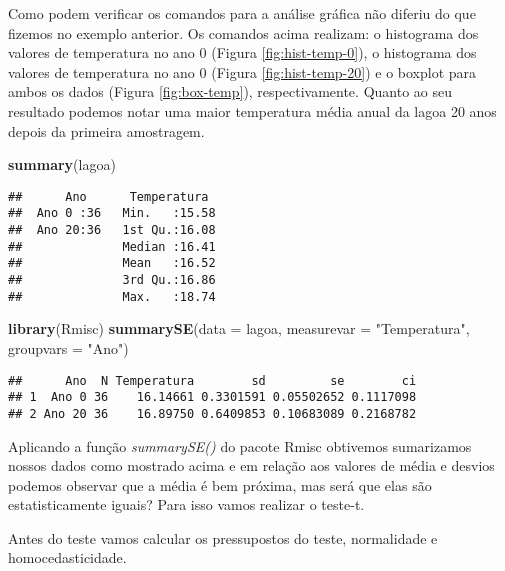 \documentclass[]{book}
\newenvironment{Shaded}{\begin{snugshade}}{\end{snugshade}}
\newcommand{\DataTypeTok}[1]{\textcolor[rgb]{0.13,0.29,0.53}{#1}}
\newcommand{\KeywordTok}[1]{\textcolor[rgb]{0.13,0.29,0.53}{\textbf{#1}}}
\newcommand{\NormalTok}[1]{#1}
\newcommand{\OperatorTok}[1]{\textcolor[rgb]{0.81,0.36,0.00}{\textbf{#1}}}
\newcommand{\StringTok}[1]{\textcolor[rgb]{0.31,0.60,0.02}{#1}}
\begin{document}
Como podem verificar os comandos para a análise gráfica não diferiu do que fizemos no exemplo anterior. Os comandos acima realizam: o histograma dos valores de temperatura no ano 0 (Figura \ref{fig:hist-temp-0}), o histograma dos valores de temperatura no ano 0 (Figura \ref{fig:hist-temp-20}) e o boxplot para ambos os dados (Figura \ref{fig:box-temp}), respectivamente. Quanto ao seu resultado podemos notar uma maior temperatura média anual da lagoa 20 anos depois da primeira amostragem.

\begin{Shaded}
\begin{Highlighting}[]
\KeywordTok{summary}\NormalTok{(lagoa)}
\end{Highlighting}
\end{Shaded}

\begin{verbatim}
##      Ano      Temperatura   
##  Ano 0 :36   Min.   :15.58  
##  Ano 20:36   1st Qu.:16.08  
##              Median :16.41  
##              Mean   :16.52  
##              3rd Qu.:16.86  
##              Max.   :18.74
\end{verbatim}

\begin{Shaded}
\begin{Highlighting}[]
\KeywordTok{library}\NormalTok{(Rmisc)}
\KeywordTok{summarySE}\NormalTok{(}\DataTypeTok{data =}\NormalTok{ lagoa, }\DataTypeTok{measurevar =} \StringTok{"Temperatura"}\NormalTok{, }\DataTypeTok{groupvars =} \StringTok{"Ano"}\NormalTok{)}
\end{Highlighting}
\end{Shaded}

\begin{verbatim}
##      Ano  N Temperatura        sd         se        ci
## 1  Ano 0 36    16.14661 0.3301591 0.05502652 0.1117098
## 2 Ano 20 36    16.89750 0.6409853 0.10683089 0.2168782
\end{verbatim}

Aplicando a função \emph{summarySE()} do pacote Rmisc obtivemos sumarizamos nossos dados como mostrado acima e em relação aos valores de média e desvios podemos observar que a média é bem próxima, mas será que elas são estatisticamente iguais? Para isso vamos realizar o teste-t.

Antes do teste vamos calcular os pressupostos do teste, normalidade e homocedasticidade.

\begin{Shaded}
\end{Shaded}
\end{document}
